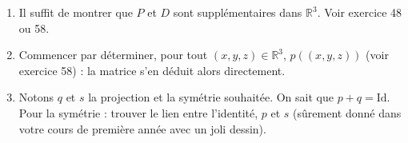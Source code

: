 \documentclass[a4paper,twoside,french,11pt]{VcCours}
\begin{document}
\begin{Exercice}{}\end{Exercice}
\begin{enumerate}
\item Il suffit de montrer que $P$ et $D$ sont supplémentaires dans $\mathbb{R}^3$. Voir exercice 48 ou 58.
\item Commencer par déterminer, pour tout $(x,y,z) \in \mathbb{R}^3$, $p((x,y,z))$ (voir exercice 58) : la matrice s'en déduit alors directement.
\item Notons $q$ et $s$ la projection et la symétrie souhaitée. On sait que $p+q=\textrm{Id}$. Pour la symétrie : trouver le lien entre l'identité, $p$ et $s$ (sûrement donné dans votre cours de première année avec un joli dessin).
\end{enumerate}
\end{document}
